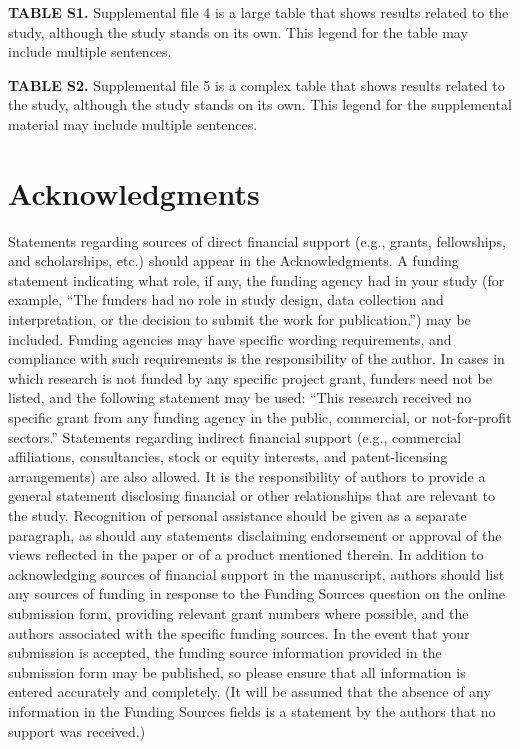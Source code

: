 \documentclass[lineno]{asm-article}
\begin{document}
\textbf{TABLE S1.} Supplemental file 4 is a large table that shows results related to the study, although the study stands on its own. This legend for the table may include multiple sentences.

\textbf{TABLE S2.} Supplemental file 5 is a complex table that shows results related to the study, although the study stands on its own. This legend for the supplemental material may include multiple sentences.


\section{Acknowledgments}
Statements regarding sources of direct financial support (e.g., grants, fellowships, and scholarships, etc.) should appear in the Acknowledgments. A funding statement indicating what role, if any, the funding agency had in your study (for example, ``The funders had no role in study design, data collection and interpretation, or the decision to submit the work for publication.'') may be included. Funding agencies may have specific wording requirements, and compliance with such requirements is the responsibility of the author. In cases in which research is not funded by any specific project grant, funders need not be listed, and the following statement may be used: ``This research received no specific grant from any funding agency in the public, commercial, or not-for-profit sectors.'' Statements regarding indirect financial support (e.g., commercial affiliations, consultancies, stock or equity interests, and patent-licensing arrangements) are also allowed. It is the responsibility of authors to provide a general statement disclosing financial or other relationships that are relevant to the study.  Recognition of personal assistance should be given as a separate paragraph, as should any statements disclaiming endorsement or approval of the views reflected in the paper or of a product mentioned therein. In addition to acknowledging sources of financial support in the manuscript, authors should list any sources of funding in response to the Funding Sources question on the online submission form, providing relevant grant numbers where possible, and the authors associated with the specific funding sources. In the event that your submission is accepted, the funding source information provided in the submission form may be published, so please ensure that all information is entered accurately and completely. (It will be assumed that the absence of any information in the Funding Sources fields is a statement by the authors that no support was received.)
\end{document}
